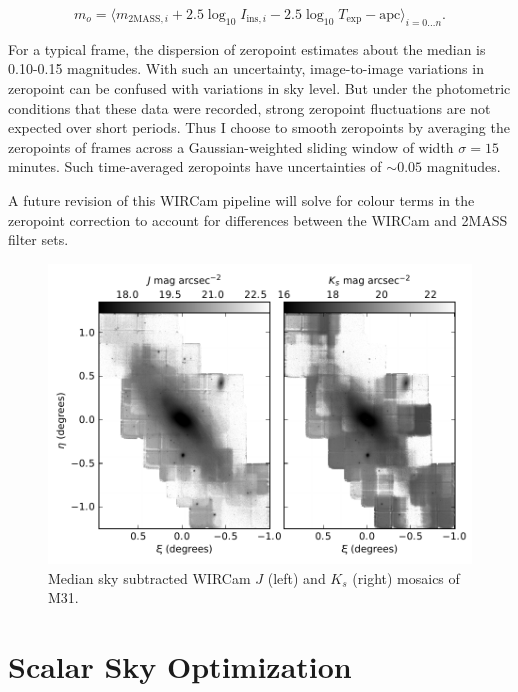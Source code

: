 \documentclass[iop]{emulateapj}
\begin{document}
\begin{equation}
    m_o = \langle m_{\text{2MASS},i} +2.5\log_{10}I_{\text{ins},i} - 2.5 \log_{10} T_\text{exp} - \text{apc} \rangle_{i=0\ldots n}.
\end{equation}

For a typical frame, the dispersion of zeropoint estimates about the median is 0.10-0.15 magnitudes. With such an uncertainty, image-to-image variations in zeropoint can be confused with variations in sky level. But under the photometric conditions that these data were recorded, strong zeropoint fluctuations are not expected over short periods. Thus I choose to smooth zeropoints by averaging the zeropoints of frames across a Gaussian-weighted sliding window of width $\sigma=15$ minutes. Such time-averaged zeropoints have uncertainties of $\sim 0.05$ magnitudes.

A future revision of this WIRCam pipeline will solve for colour terms in the zeropoint correction to account for differences between the WIRCam and 2MASS filter sets.

\begin{figure}[t]
	\centering
		\includegraphics[width=6in]{figs/raw_mosaics}
	\caption{Median sky subtracted WIRCam $J$ (left) and $K_s$ (right) mosaics of M31.}
	\label{fig:raw_mosaics}
\end{figure}

\section{Scalar Sky Optimization}
\label{sec:scalar}
\end{document}
